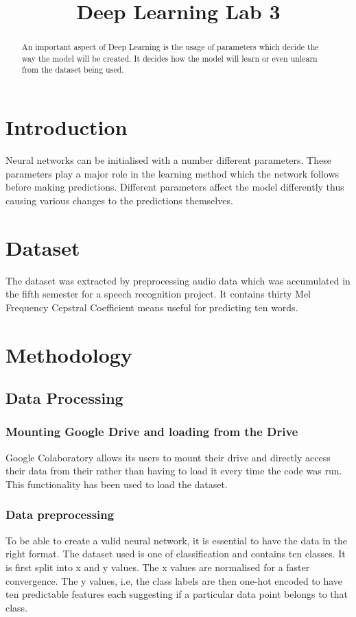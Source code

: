 \documentclass[conference,compsoc]{IEEEtran}
\begin{document}
\title{Deep Learning Lab 3}
\author{}

\maketitle
\begin{abstract}
    An important aspect of Deep Learning is the usage of parameters which decide the way the model will be created. It decides how the model will learn or even unlearn from the dataset being used.
\end{abstract}

\section{Introduction}
Neural networks can be initialised with a number different parameters. These parameters play a major role in the learning method which the network follows before making predictions. Different parameters affect the model differently thus causing various changes to the predictions themselves.

\section{Dataset}
The dataset was extracted by preprocessing audio data which was accumulated in the fifth semester for a speech recognition project. It contains thirty Mel Frequency Cepstral Coefficient means useful for predicting ten words.

\section{Methodology}
\subsection{Data Processing}
\subsubsection{Mounting Google Drive and loading from the Drive}
Google Colaboratory allows its users to mount their drive and directly access their data from their rather than having to load it every time the code was run. This functionality has been used to load the dataset.

\subsubsection{Data preprocessing}
To be able to create a valid neural network, it is essential to have the data in the right format. The dataset used is one of classification and contains ten classes. It is first split into x and y values. The x values are normalised for a faster convergence. The y values, i.e, the class labels are then one-hot encoded to have ten predictable features each suggesting if a particular data point belongs to that class.
\end{document}
